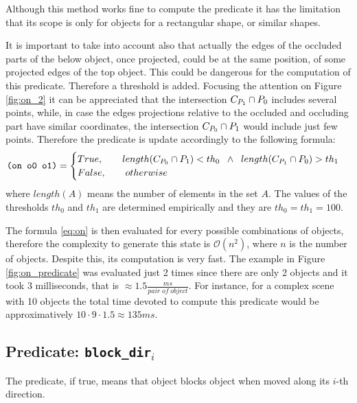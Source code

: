 Although this method works fine to compute the  predicate it has the limitation that its scope is only for objects for a rectangular shape, or similar shapes.

It is important to take into account also that actually the edges of the occluded parts of the below object, once projected, could be at the same position, of some projected edges of the top object. This could be dangerous for the computation of this predicate. Therefore a threshold is added. Focusing the attention on Figure \ref{fig:on_2} it can be appreciated that the intersection ${\sc C_{P_{1}}} \cap {\sc P_{0}}$ includes several points, while, in case the edges projections relative to the occluded and occluding part have similar coordinates, the intersection ${\sc C_{P_{0}}} \cap {\sc P_{1}}$ would include just few points. Therefore the  predicate is update accordingly to the following formula:
\begin{equation}
\texttt{(on o0 o1)} =
\begin{cases}
{\sc True}, \qquad length({\sc C_{P_{0}}} \cap {\sc P_{1}}) < th_0 \;\; \wedge \;\; length({\sc C_{P_{1}}} \cap {\sc P_{0}}) > th_1 \\
{\sc False}, \qquad otherwise
\end{cases}
\label{eq:on}
\end{equation}
where $length(A)$ means the number of elements in the set $A$.
The values of the thresholds $th_0$ and $th_1$ are determined empirically and they are $th_0=th_1=100$.

The formula \ref{eq:on} is then evaluated for every possible combinations of objects, therefore the complexity to generate this state is $\mathcal{O}(n^2)$, where $n$ is the number of objects. Despite this, its computation is very fast. The example in Figure \ref{fig:on_predicate} was evaluated just 2 times since there are only 2 objects and it took $3$ milliseconds, that is $\approx 1.5 \frac{ms}{pair \; of \; object}$. For instance, for a complex scene with 10 objects the total time devoted to compute this predicate would be approximatively $10 \cdot 9 \cdot 1.5 \approx 135 ms$.



\subsection{Predicate: \texttt{block\_dir$_i$}}
The  predicate, if true, means that object  blocks object  when moved along its $i$-th direction. 

